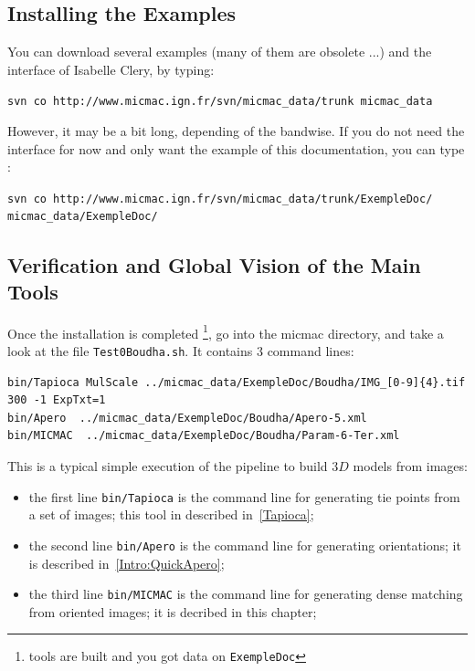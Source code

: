 
\subsection{Installing the Examples}

You can download several examples (many of them are obsolete ...) and the interface of
Isabelle Clery, by typing:

{\tt svn co http://www.micmac.ign.fr/svn/micmac\_data/trunk micmac\_data}

However, it may be a bit long, depending of the bandwise. If you do not need
the interface for now and only want the example of this documentation, you can type :

{\tt svn co http://www.micmac.ign.fr/svn/micmac\_data/trunk/ExempleDoc/ micmac\_data/ExempleDoc/}





\subsection{Verification and Global Vision of the Main Tools}

\label{SHEL:TEST:BOUDHA}

Once the installation is completed \footnote{tools are built and you got data
on {\tt ExempleDoc}}, go into the micmac directory,
and take a look at the file {\tt Test0Boudha.sh}. It contains
$3$ command lines:

{\scriptsize
\begin{verbatim}
bin/Tapioca MulScale ../micmac_data/ExempleDoc/Boudha/IMG_[0-9]{4}.tif 300 -1 ExpTxt=1
bin/Apero  ../micmac_data/ExempleDoc/Boudha/Apero-5.xml
bin/MICMAC  ../micmac_data/ExempleDoc/Boudha/Param-6-Ter.xml
\end{verbatim}
}

This is a typical simple execution of the pipeline to build $3D$ models from images:

\begin{itemize}
    \item the first line {\tt bin/Tapioca} is the command line for generating tie points
          from a set of images; this tool in described in~\ref{Tapioca};

    \item the second line {\tt bin/Apero} is the command line for generating orientations;
           it is described in~\ref{Intro:QuickApero};


    \item the third line {\tt bin/MICMAC} is the command line for generating dense
          matching from oriented images; it is decribed in this chapter;
\end{itemize}



